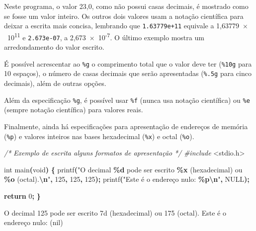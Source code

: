 \documentclass[
  11pt,
  a4paper,
]{scrbook}
\newenvironment{Shaded}{\begin{snugshade}}{\end{snugshade}}
\newcommand{\CommentTok}[1]{\textcolor[rgb]{0.56,0.35,0.01}{\textit{#1}}}
\newcommand{\ControlFlowTok}[1]{\textcolor[rgb]{0.13,0.29,0.53}{\textbf{#1}}}
\newcommand{\DataTypeTok}[1]{\textcolor[rgb]{0.13,0.29,0.53}{#1}}
\newcommand{\DecValTok}[1]{\textcolor[rgb]{0.00,0.00,0.81}{#1}}
\newcommand{\ImportTok}[1]{#1}
\newcommand{\NormalTok}[1]{#1}
\newcommand{\OperatorTok}[1]{\textcolor[rgb]{0.81,0.36,0.00}{\textbf{#1}}}
\newcommand{\PreprocessorTok}[1]{\textcolor[rgb]{0.56,0.35,0.01}{\textit{#1}}}
\newcommand{\SpecialCharTok}[1]{\textcolor[rgb]{0.81,0.36,0.00}{\textbf{#1}}}
\newcommand{\StringTok}[1]{\textcolor[rgb]{0.31,0.60,0.02}{#1}}
\begin{document}
Neste programa, o valor 23,0, como não possui casas decimais, é mostrado
como se fosse um valor inteiro. Os outros dois valores usam a notação
científica para deixar a escrita mais concisa, lembrando que
\texttt{1.63779e+11} equivale a
1,63779~\(\times\)~10\textsuperscript{11} e \texttt{2.673e-07}, a
2,673~\(\times\)~10\textsuperscript{-7}. O último exemplo mostra um
arredondamento do valor escrito.

É possível acrescentar ao \texttt{\%g} o comprimento total que o valor
deve ter (\texttt{\%10g} para 10 espaços), o número de casas decimais
que serão apresentadas (\texttt{\%.5g} para cinco decimais), além de
outras opções.

Além da especificação \texttt{\%g}, é possível usar \texttt{\%f} (nunca
usa notação científica) ou \texttt{\%e} (sempre notação científica) para
valores reais.

Finalmente, ainda há especificações para apresentação de endereços de
memória (\texttt{\%p}) e valores inteiros nas bases hexadecimal
(\texttt{\%x}) e octal (\texttt{\%o}).

\begin{Shaded}
\begin{Highlighting}[]
\CommentTok{/*}
\CommentTok{Exemplo de escrita alguns formatos de apresentação}
\CommentTok{*/}
\PreprocessorTok{\#include }\ImportTok{\textless{}stdio.h\textgreater{}}

\DataTypeTok{int}\NormalTok{ main}\OperatorTok{(}\DataTypeTok{void}\OperatorTok{)} \OperatorTok{\{}
\NormalTok{    printf}\OperatorTok{(}\StringTok{"O decimal }\SpecialCharTok{\%d}\StringTok{ pode ser escrito }\SpecialCharTok{\%x}\StringTok{ (hexadecimal) ou }\SpecialCharTok{\%o}\StringTok{ (octal).}\SpecialCharTok{\textbackslash{}n}\StringTok{"}\OperatorTok{,}
        \DecValTok{125}\OperatorTok{,} \DecValTok{125}\OperatorTok{,} \DecValTok{125}\OperatorTok{);}
\NormalTok{    printf}\OperatorTok{(}\StringTok{"Este é o endereço nulo: }\SpecialCharTok{\%p\textbackslash{}n}\StringTok{"}\OperatorTok{,}\NormalTok{ NULL}\OperatorTok{);}

    \ControlFlowTok{return} \DecValTok{0}\OperatorTok{;}
\OperatorTok{\}}
\end{Highlighting}
\end{Shaded}

\begin{Shaded}
\begin{Highlighting}[]
\NormalTok{O decimal 125 pode ser escrito 7d (hexadecimal) ou 175 (octal).}
\NormalTok{Este é o endereço nulo: (nil)}
\end{Highlighting}
\end{Shaded}
\end{document}
